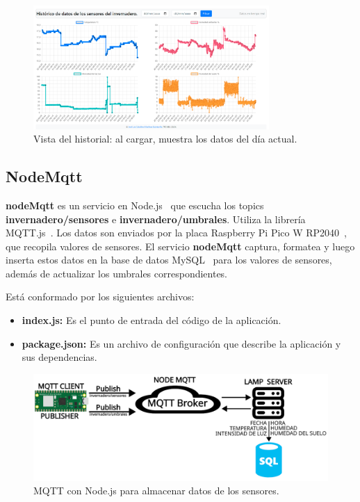 \begin{figure}[h]
    \centering
    \includegraphics[width=0.8\textwidth]{img/desarrollo/Dashboard_Historico.png}
    \caption{Vista del historial: al cargar, muestra los datos del día actual.} \label{Img:Dashboard_Historico}
\end{figure}

\subsection{NodeMqtt}\label{proyecto:NodeMqtt}
\textbf{nodeMqtt} es un servicio en Node.js~\cite{misc:Nodejs} que escucha los topics \textbf{invernadero/sensores} e \textbf{invernadero/umbrales}. Utiliza la librería MQTT.js~\cite{misc:MQTTjs}. Los datos son enviados por la placa Raspberry Pi Pico W RP2040~\cite{misc:RPiPicoW}, que recopila valores de sensores. El servicio \textbf{nodeMqtt} captura, formatea y luego inserta estos datos en la base de datos MySQL~\cite{misc:Mysql} para los valores de sensores, además de actualizar los umbrales correspondientes.

Está conformado por los siguientes archivos:

\begin{itemize}
	\item \textbf{index.js:}
		Es el punto de entrada del código de la aplicación.
	\item \textbf{package.json:}
		Es un archivo de configuración que describe la aplicación y sus dependencias.
\end{itemize}

\begin{figure}[h]
	\centering
	\includegraphics[width=1\textwidth]{img/diagramas/mqtt_nodeMqtt.png}
	\caption{MQTT con Node.js para almacenar datos de los sensores.}
\end{figure}


